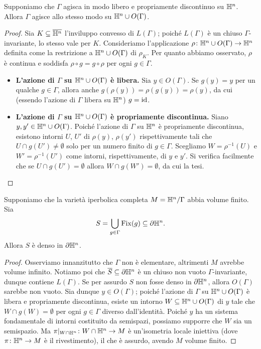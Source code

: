 \begin{proposition*}
Supponiamo che $\Gamma$ agisca in modo libero e propriamente discontinuo su $\mathbb{H}^n$. Allora $\Gamma$ agisce allo stesso modo su $\mathbb{H}^n\cup O(\Gamma)$.
\end{proposition*}
\begin{proof}
Sia $K\subseteq\overline{\mathbb{H}^n}$ l'inviluppo convesso di $L(\Gamma)$; poiché $L(\Gamma)$ è un chiuso $\Gamma$-invariante, lo stesso vale per $K$. Consideriamo l'applicazione $\rho\colon\mathbb{H}^n\cup O(\Gamma)\to\mathbb{H}^n$ definita come la restrizione a $\mathbb{H}^n\cup O(\Gamma)$ di $\rho_K$. Per quanto abbiamo osservato, $\rho$ è continua e soddisfa $\rho\circ g=g\circ\rho$ per ogni $g\in\Gamma$.

\begin{itemize}
\item \textbf{L'azione di $\Gamma$ su $\mathbb{H}^n\cup O(\Gamma)$ è libera.} Sia $y\in O(\Gamma)$. Se $g(y)=y$ per un qualche $g\in\Gamma$, allora anche $g(\rho(y))=\rho(g(y))=\rho(y)$, da cui (essendo l'azione di $\Gamma$ libera su $\mathbb{H}^n$) $g=\operatorname{id}$.
\item \textbf{L'azione di $\Gamma$ su $\mathbb{H}^n\cup O(\Gamma)$ è propriamente discontinua.} Siano $y,y'\in\mathbb{H}^n\cup O(\Gamma)$. Poiché l'azione di $\Gamma$ su $\mathbb{H}^n$ è propriamente discontinua, esistono intorni $U$, $U'$ di $\rho(y)$, $\rho(y')$ rispettivamente tali che $U\cap g(U')\neq\emptyset$ solo per un numero finito di $g\in\Gamma$. Scegliamo $W=\rho^{-1}(U)$ e $W'=\rho^{-1}(U')$ come intorni, rispettivamente, di $y$ e $y'$. Si verifica facilmente che se $U\cap g(U')=\emptyset$ allora $W\cap g(W')=\emptyset$, da cui la tesi.\qedhere
\end{itemize}
\end{proof}

\begin{theorem*}
Supponiamo che la varietà iperbolica completa $M=\mathbb{H}^n/\Gamma$ abbia volume finito. Sia
\[
S=\bigcup_{g\in\Gamma}\operatorname{Fix}(g)\subseteq\partial\mathbb{H}^n.
\]
Allora $S$ è denso in $\partial\mathbb{H}^n$.
\end{theorem*}
\begin{proof}
Osserviamo innanzitutto che $\Gamma$ non è elementare, altrimenti $M$ avrebbe volume infinito. Notiamo poi che $\overline{S}\subseteq\partial\mathbb{H}^n$ è un chiuso non vuoto $\Gamma$-invariante, dunque contiene $L(\Gamma)$. Se per assurdo $S$ non fosse denso in $\partial\mathbb{H}^n$, allora $O(\Gamma)$ sarebbe non vuoto. Sia dunque $y\in O(\Gamma)$; poiché l'azione di $\Gamma$ su $\mathbb{H}^n\cup O(\Gamma)$ è libera e propriamente discontinua, esiste un intorno $W\subseteq\mathbb{H}^n\cup O(\Gamma)$ di $y$ tale che $W\cap g(W)=\emptyset$ per ogni $g\in\Gamma$ diverso dall'identità. Poiché $y$ ha un sistema fondamentale di intorni costituito da semispazi, possiamo supporre che $W$ sia un semispazio. Ma $\pi|_{W\cap\mathbb{H}^n}\colon W\cap\mathbb{H}^n\to M$ è un'isometria locale iniettiva (dove $\pi\colon\mathbb{H}^n\to M$ è il rivestimento), il che è assurdo, avendo $M$ volume finito.
\end{proof}